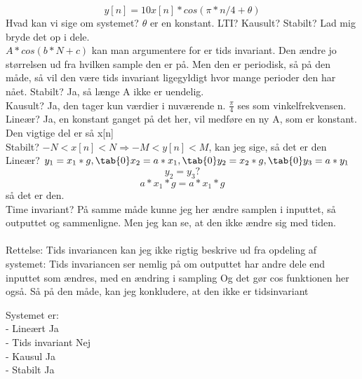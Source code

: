 \begin{Opgaver}
\begin{kapitel}
        \begin{Opgave}
            \[y[n] = 10x[n]*cos(\pi*n/4 + \theta)\]
            Hvad kan vi sige om systemet? $\theta$ er en konstant. 
            LTI? Kausult? Stabilt? Lad mig bryde det op i dele.\\ 
            $A*cos(b*N + c)$ kan man argumentere for er tids invariant. Den ændre jo størrelsen ud fra hvilken sample den er på. 
            Men den er periodisk, så på den måde, så vil den være tids invariant ligegyldigt hvor mange perioder den har nået. 
            Stabilt? Ja, så længe A ikke er uendelig. \\
            Kausult? Ja, den tager kun værdier i nuværende n. $\frac{\pi}{4}$ ses som vinkelfrekvensen.
            Lineær? Ja, en konstant ganget på det her, vil medføre en ny A, som er konstant. \\
            Den vigtige del er så x[n]\\ 
            Stabilt? $-N < x[n] < N \Rightarrow -M < y[n] < M$, kan jeg sige, så det er den
            Lineær? $y_1 = x_1 * g, \tab{0} x_2 = a * x_1, \tab{0} y_2 = x_2 * g, \tab{0} y_3 = a*y_1$
            \[y_2 = y_3 ?\]
            \[a*x_1 * g = a * x_1 * g\]
            så det er den.\\
            Time invariant? På samme måde kunne jeg her ændre samplen i inputtet, så outputtet og sammenligne. 
            Men jeg kan se, at den ikke ændre sig med tiden. \\\\

            Rettelse: Tids invariancen kan jeg ikke rigtig beskrive ud fra opdeling af systemet: 
            Tids invariancen ser nemlig på om outputtet har andre dele end inputtet som ændres, med en ændring i sampling
            Og det gør cos funktionen her også. Så på den måde, kan jeg konkludere, at den ikke er tidsinvariant

            Systemet er: \\
            - Lineært Ja \\ 
            - Tids invariant Nej \\
            - Kausul Ja \\
            - Stabilt Ja \\

        \end{Opgave}


\end{kapitel}
\end{Opgaver}
